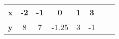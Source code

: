 \begin{tabular}[12pt]{ |c | c|c|c|c|c|c|c|}
    \hline
    \textbf{x} & -2 & -1 & 0 & 1 & 3 \\ 
    \hline
    \textbf{y} & 8 & 7 & -1.25 & 3 & -1 \\
    \hline
    \end{tabular}